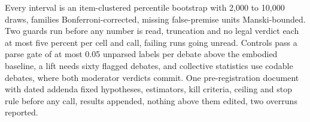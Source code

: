 Every interval is an item-clustered percentile bootstrap with 2,000 to
10,000 draws, families Bonferroni-corrected, missing false-premise units
Manski-bounded. %
Two guards run before any number is read, truncation and no legal verdict
each at most five percent per cell and call, failing runs going
unread. %
Controls pass a parse gate of at most 0.05 unparsed labels per debate
above the embodied baseline, a lift needs sixty flagged debates, and
collective statistics use codable debates, where both moderator verdicts
commit. %
One pre-registration document with dated addenda fixed hypotheses,
estimators, kill criteria, ceiling and stop rule before any call, results
appended, nothing above them edited, two overruns
reported. %

